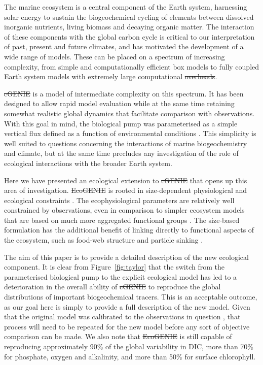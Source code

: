 \documentclass[gmd, manuscript]{copernicus}
\providecommand{\DIFadd}[1]{{\protect\color{blue}\uwave{#1}}} %
\providecommand{\DIFdel}[1]{{\protect\color{red}\sout{#1}}}                      %
\providecommand{\DIFaddbegin}{} %
\providecommand{\DIFaddend}{} %
\providecommand{\DIFdelbegin}{} %
\providecommand{\DIFdelend}{} %
\begin{document}
The marine ecosystem is a central component of the Earth system, harnessing solar energy to sustain the biogeochemical cycling of elements between dissolved inorganic nutrients, living biomass and decaying organic matter. The interaction of these components with the global carbon cycle is critical to our interpretation of past, present and future climates, and has motivated the development of a wide range of models. These can be placed on a spectrum of increasing complexity, from simple and computationally efficient box models to fully coupled Earth system models with extremely large computational \DIFdelbegin \DIFdel{overheads}\DIFdelend \DIFaddbegin \DIFadd{costs}\DIFaddend . 

\DIFdelbegin \DIFdel{cGENIE }\DIFdelend \DIFaddbegin \DIFadd{cGEnIE }\DIFaddend is a model of intermediate complexity on this spectrum. It has been designed to allow rapid model evaluation while at the same time retaining somewhat realistic global dynamics that facilitate comparison with observations. With this goal in mind, the biological pump was parameterised as a simple vertical flux defined as a function of environmental conditions \citep{Ridgwell:2007}. This simplicity is well suited to questions concerning the interactions of marine biogeochemistry and climate, but at the same time precludes any investigation of the role of ecological interactions with the broader Earth system.

Here we have presented an ecological extension to \DIFdelbegin \DIFdel{cGENIE }\DIFdelend \DIFaddbegin \DIFadd{cGEnIE }\DIFaddend that opens up this area of investigation. \DIFdelbegin \DIFdel{EcoGENIE }\DIFdelend \DIFaddbegin \DIFadd{EcoGEnIE }\DIFaddend is rooted in size-dependent physiological and ecological constraints \citep{Ward:2012}. The ecophysiological parameters are relatively well constrained by observations, even in comparison to simpler ecosystem models that are based on much more aggregated functional groups \citep{Anderson:2005,Litchman:2007}. The size-based formulation has the additional benefit of linking directly to functional aspects of the ecosystem, such as food-web structure and particle sinking \citep{Ward:2016}. 

The aim of this paper is to provide a detailed description of the new ecological component. It is clear from Figure~\ref{fig:taylor} that the switch from the parameterised biological pump to the explicit ecological model has led to a deterioration in the overall ability of \DIFdelbegin \DIFdel{cGENIE }\DIFdelend \DIFaddbegin \DIFadd{cGEnIE }\DIFaddend to reproduce the global distributions of important biogeochemical tracers. This is an acceptable outcome, as our goal here is simply to provide a full description of the new model. Given that the original model was calibrated to the observations in question \citep{Ridgwell:2007}, that process will need to be repeated for the new model before any sort of objective comparison can be made. We also note that \DIFdelbegin \DIFdel{EcoGENIE }\DIFdelend \DIFaddbegin \DIFadd{EcoGEnIE }\DIFaddend is still capable of reproducing approximately 90\% of the global variability in DIC, more than 70\% for phosphate, oxygen and alkalinity, and more than 50\% for surface chlorophyll.
\end{document}
